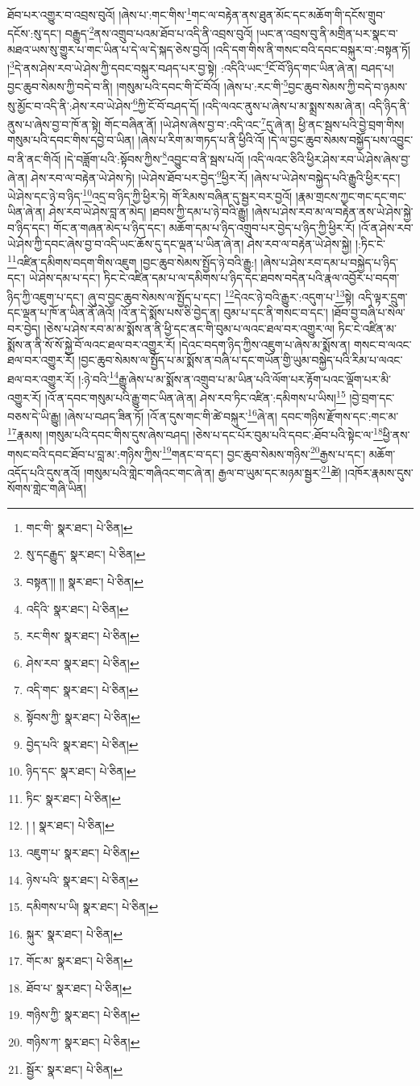 ཐོབ་པར་འགྱུར་བ་འབྲས་བུའོ། །ཞེས་པ་:གང་གིས་\footnote{གང་གི་  སྣར་ཐང་།  པེ་ཅིན། }གང་ལ་བརྟེན་ནས་ཐུན་མོང་དང་མཆོག་གི་དངོས་གྲུབ་དངོས་:སུ་དང་། བརྒྱུད་\footnote{སུ་དངརྒྱུད་  སྣར་ཐང་།  པེ་ཅིན། }ནས་འགྲུབ་པའམ་ཐོབ་པ་འདི་ནི་འབྲས་བུའོ། །ཡང་ན་འབྲས་བུ་ནི་མགྲིན་པར་སྣང་བ་མཐའ་ཡས་སུ་གྱུར་པ་གང་ཡིན་པ་དེ་ལ་དེ་སྐད་ཅེས་བྱའོ། །འདི་དག་གིས་ནི་གསང་བའི་དབང་བསྐུར་བ་:བསྟན་ཏོ། །\footnote{བསྟན་།། །།  སྣར་ཐང་།  པེ་ཅིན། }དེ་ནས་ཤེས་རབ་ཡེ་ཤེས་ཀྱི་དབང་བསྐུར་བཤད་པར་བྱ་སྟེ། :འདིའི་ཡང་\footnote{འདིའི་  སྣར་ཐང་།  པེ་ཅིན། }ངོ་བོ་ཉིད་གང་ཡིན་ཞེ་ན། བཤད་པ། བྱང་ཆུབ་སེམས་ཀྱི་བདེ་བ་ནི། །གསུམ་པའི་དབང་གི་ངོ་བོའོ། །ཞེས་པ་:རང་གི་\footnote{རང་གིས་  སྣར་ཐང་།  པེ་ཅིན། }བྱང་ཆུབ་སེམས་ཀྱི་བདེ་བ་ཉམས་སུ་མྱོང་བ་འདི་ནི་:ཤེས་རབ་ཡེ་ཤེས་\footnote{ཤེས་རབ་  སྣར་ཐང་།  པེ་ཅིན། }ཀྱི་ངོ་བོ་བཤད་དོ། །འདི་ལའང་ནུས་པ་ཞེས་པ་མ་སྨྲས་སམ་ཞེ་ན། འདི་ཉིད་ནི་ནུས་པ་ཞེས་བྱ་བ་ཁོ་ན་སྟེ། གོང་བཞིན་ནོ། །ཡེ་ཤེས་ཞེས་བྱ་བ་:འདི་འང་\footnote{འདི་གང་  སྣར་ཐང་།  པེ་ཅིན། }དུ་ཞེ་ན། ཕྱི་ནང་སྦས་པའི་བྱེ་བྲག་གིས། གསུམ་པའི་དབང་གིས་དབྱེ་བ་ཡིན། །ཞེས་པ་རིག་མ་གཏད་པ་ནི་ཕྱིའི་འོ། །དེ་ལ་བྱང་ཆུབ་སེམས་བསྐྱོད་པས་འབྱུང་བ་ནི་ནང་གིའོ། །དེ་བཟློག་པའི་:སྟོབས་ཀྱིས་\footnote{སྟོབས་ཀྱི་  སྣར་ཐང་།  པེ་ཅིན། }འབྱུང་བ་ནི་སྦས་པའོ། །འདི་ལའང་ཅིའི་ཕྱིར་ཤེས་རབ་ཡེ་ཤེས་ཞེས་བྱ་ཞེ་ན། ཤེས་རབ་ལ་བརྟེན་ཡེ་ཤེས་ཏེ། །ཡེ་ཤེས་ཐོབ་པར་བྱེད་\footnote{བྱེད་པའི་  སྣར་ཐང་།  པེ་ཅིན། }ཕྱིར་རོ། །ཞེས་པ་ཡེ་ཤེས་བསྐྱེད་པའི་རྒྱུའི་ཕྱིར་དང་། ཡེ་ཤེས་དང་ཉེ་བ་ཉིད་\footnote{ཉིད་དང་  སྣར་ཐང་།  པེ་ཅིན། }འདྲ་བ་ཉིད་ཀྱི་ཕྱིར་ཏེ། གོ་རིམས་བཞིན་དུ་སྦྱར་བར་བྱའོ། །རྣམ་གྲངས་ཀྱང་གང་དང་གང་ཡིན་ཞེ་ན། ཤེས་རབ་ཡེ་ཤེས་བླ་ན་མེད། །ཐབས་ཀྱི་དམ་པ་ཉེ་བའི་རྒྱུ། །ཞེས་པ་ཤེས་རབ་མ་ལ་བརྟེན་ནས་ཡེ་ཤེས་སྐྱེ་བ་ཉིད་དང་། གོང་ན་གཞན་མེད་པ་ཉིད་དང་། མཆོག་དམ་པ་ཉིད་འགྲུབ་པར་བྱེད་པ་ཉིད་ཀྱི་ཕྱིར་རོ། །འོ་ན་ཤེས་རབ་ཡེ་ཤེས་ཀྱི་དབང་ཞེས་བྱ་བ་འདི་ཡང་ཆོས་དུ་དང་ལྡན་པ་ཡིན་ཞེ་ན། ཤེས་རབ་ལ་བརྟེན་ཡེ་ཤེས་སྐྱེ། །:ཏིང་ངེ་\footnote{ཏིང་  སྣར་ཐང་།  པེ་ཅིན། }འཛིན་དམིགས་བདག་གིས་འཇུག །བྱང་ཆུབ་སེམས་སྤྱོད་ཉེ་བའི་རྒྱུ:། །ཞེས་པ་ཤེས་རབ་དམ་པ་བསྐྱེད་པ་ཉིད་དང་། ཡེ་ཤེས་དམ་པ་དང་། ཏིང་ངེ་འཛིན་དམ་པ་ལ་དམིགས་པ་ཉིད་དང་ཐབས་བདེན་པའི་རྣལ་འབྱོར་པ་བདག་ཉིད་ཀྱི་འཇུག་པ་དང་། ཞུ་བ་བྱང་ཆུབ་སེམས་ལ་སྤྱོད་པ་དང་། \footnote{། །   སྣར་ཐང་།  པེ་ཅིན། }དེའང་ཉེ་བའི་རྒྱུར་:འདུག་པ་\footnote{འཇུག་པ་  སྣར་ཐང་།  པེ་ཅིན། }སྟེ། འདི་ལྟར་དྲུག་དང་ལྡན་པ་ཁོ་ན་ཡིན་ནོ་ཞེའོ། །འོ་ན་དེ་སྨོས་པས་ཅི་བྱེད་ན། བུམ་པ་དང་ནི་གསང་བ་དང་། །ཐོབ་བྱ་བཞི་པ་སེལ་བར་བྱེད། །ཅེས་པ་ཤེས་རབ་མ་མ་སྨོས་ན་ནི་ཕྱི་དང་ནང་གི་བུམ་པ་ལའང་ཐལ་བར་འགྱུར་ལ། ཏིང་ངེ་འཛིན་མ་སྨོས་ན་ནི་སོ་སོ་སྐྱེ་བོ་ལའང་ཐལ་བར་འགྱུར་རོ། །དེའང་བདག་ཉིད་ཀྱིས་འཇུག་པ་ཞེས་མ་སྨོས་ན། གསང་བ་ལའང་ཐལ་བར་འགྱུར་རོ། །བྱང་ཆུབ་སེམས་ལ་སྤྱོད་པ་མ་སྨོས་ན་བཞི་པ་དང་གཡོན་གྱི་ཡུམ་བསྐྱེད་པའི་རིམ་པ་ལའང་ཐལ་བར་འགྱུར་རོ། །:ཉེ་བའི་\footnote{ཉེས་པའི་  སྣར་ཐང་།  པེ་ཅིན། }རྒྱུ་ཞེས་པ་མ་སྨོས་ན་འགྲུབ་པ་མ་ཡིན་པའི་ལོག་པར་རྟོག་པའང་ལྡོག་པར་མི་འགྱུར་རོ། །འོ་ན་དབང་གསུམ་པའི་རྒྱུ་གང་ཡིན་ཞེ་ན། ཤེས་རབ་ཏིང་འཛིན་:དམིགས་པ་ཡིས།\footnote{དམིགས་པ་ཡི།  སྣར་ཐང་།  པེ་ཅིན། } །བྱེ་བྲག་དང་བཅས་དེ་ཡི་རྒྱུ། །ཞེས་པ་བཤད་ཟིན་ཏོ། །འོ་ན་དུས་གང་གི་ཚེ་བསྐུར་\footnote{སྐུར་  སྣར་ཐང་།  པེ་ཅིན། }ཞེ་ན། དབང་གཉིས་རྫོགས་དང་:གང་མ་\footnote{གོང་མ་  སྣར་ཐང་།  པེ་ཅིན། }རྣམས། །གསུམ་པའི་དབང་གིས་དུས་ཞེས་བཤད། །ཅེས་པ་དང་པོར་བུམ་པའི་དབང་:ཐོབ་པའི་སྟེང་ལ་\footnote{ཐོབ་པ་  སྣར་ཐང་།  པེ་ཅིན། }ཕྱི་ནས་གསང་བའི་དབང་ཐོབ་པ་བླ་མ་:གཉིས་ཀྱིས་\footnote{གཉིས་ཀྱི་  སྣར་ཐང་།  པེ་ཅིན། }གནང་བ་དང་། བྱང་ཆུབ་སེམས་གཉིས་\footnote{གཉིས་ཀ་  སྣར་ཐང་།  པེ་ཅིན། }རྒྱས་པ་དང་། མཆོག་འདོད་པའི་དུས་ནའོ། །གསུམ་པའི་གླེང་གཞིའང་གང་ཞེ་ན། རྒྱལ་བ་ཡུམ་དང་མཉམ་སྦྱར་\footnote{སྦྱོར་  སྣར་ཐང་།  པེ་ཅིན། }ཚེ། །འཁོར་རྣམས་དུས་སོགས་གླེང་གཞི་ཡིན། 